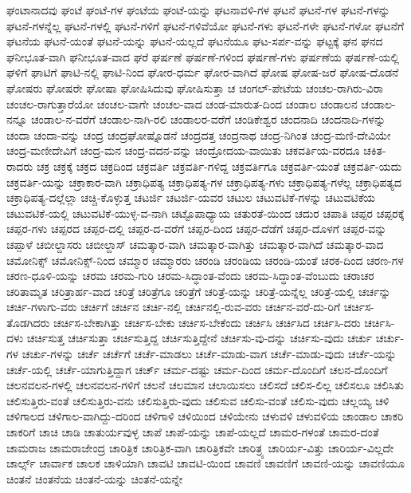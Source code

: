 {ಘಂಟಾನಾದವು
ಘಂಟೆ
ಘಂಟೆ-ಗಳ
ಘಂಟೆಯ
ಘಂಟೆ-ಯನ್ನು
ಘಟನಾವಳಿ-ಗಳ
ಘಟನೆ
ಘಟನೆ-ಗಳ
ಘಟನೆ-ಗಳನ್ನು
ಘಟನೆ-ಗಳನ್ನೆಲ್ಲ
ಘಟನೆ-ಗಳಲ್ಲಿ
ಘಟನೆ-ಗಳಿಗೆ
ಘಟನೆ-ಗಳಿವೆಯೋ
ಘಟನೆ-ಗಳು
ಘಟನೆ-ಗಳೇ
ಘಟನೆ-ಗಳೋ
ಘಟನೆಗೆ
ಘಟನೆಯ
ಘಟನೆ-ಯಂತೆ
ಘಟನೆ-ಯನ್ನು
ಘಟನೆ-ಯಲ್ಲದೆ
ಘಟನೆಯೂ
ಘಟ-ಸರ್ಪ-ವನ್ನು
ಘಟ್ಟಕ್ಕೆ
ಘನ
ಘನದ
ಘನೀಭೂತ-ವಾಗಿ
ಘನೀಭೂತ-ವಾದ
ಘರೆ
ಘರ್ಷಣೆ
ಘರ್ಷಣೆ-ಗಳಿಂದ
ಘರ್ಷಣೆ-ಗಳು
ಘರ್ಷಣೆಯ
ಘರ್ಷಣೆ-ಯಲ್ಲಿ
ಘಳಿಗೆ
ಘಾಟಿಗೆ
ಘಾಟಿ-ನಲ್ಲಿ
ಘಾಟಿ-ನಿಂದ
ಘೋರ-ಧರ್ಮ
ಘೋರ-ವಾಗಿದೆ
ಘೋಷ
ಘೋಷ-ಜರೆ
ಘೋಷ-ದೊಡನೆ
ಘೋಷರು
ಘೋಷರೇ
ಘೋಷಾ
ಘೋಷಿಸಿದುವು
ಘೋಷಿಸುತ್ತಾ
ಚ
ಚಂಗಲ್-ಪೇಟೆಯ
ಚಂಚಲ-ರಾಗಿರು-ವಿರಾ
ಚಂಚಲ-ರಾಗುತ್ತಾರೆಯೋ
ಚಂಚಲ-ವಾಗೇ
ಚಂಚಲ-ವಾದ
ಚಂಡ-ಮಾರುತ-ದಿಂದ
ಚಂಡಾಲ
ಚಂಡಾಲನ
ಚಂಡಾಲ-ನನ್ನೂ
ಚಂಡಾಲ-ನ-ವರೆಗೆ
ಚಂಡಾಲ-ನಾಗಿ-ರಲಿ
ಚಂಡಾಲರ-ವರೆಗೆ
ಚಂಡಿಕೇಶ್ವರ
ಚಂದನಾದಿ
ಚಂದನಾದಿ-ಗಳನ್ನು
ಚಂದಾ
ಚಂದಾ-ವನ್ನು
ಚಂದ್ರ
ಚಂದ್ರಘೋಷ್ನೊಡನೆ
ಚಂದ್ರದತ್ತ
ಚಂದ್ರನಾಥ
ಚಂದ್ರ-ನಿಗಿಂತ
ಚಂದ್ರ-ಮಣಿ-ದೇವಿಯೇ
ಚಂದ್ರ-ಮಣೀದೇವಿಗೆ
ಚಂದ್ರ-ಮನ
ಚಂದ್ರ-ವದನ-ವನ್ನು
ಚಂದ್ರೋದಯ-ವಾಯಿತು
ಚಕವರ್ತಿಯ-ವರದೂ
ಚಕಿತ-ರಾದರು
ಚಕ್ರ
ಚಕ್ರಕ್ಕೆ
ಚಕ್ರದ
ಚಕ್ರದಿಂದ
ಚಕ್ರವರ್ತಿ
ಚಕ್ರವರ್ತಿ-ಗಳಿದ್ದ
ಚಕ್ರವರ್ತಿಗೂ
ಚಕ್ರವರ್ತಿ-ಯಂತೆ
ಚಕ್ರವರ್ತಿ-ಯದು
ಚಕ್ರವರ್ತಿ-ಯನ್ನು
ಚಕ್ರಾಕಾರ-ವಾಗಿ
ಚಕ್ರಾಧಿಪತ್ಯ
ಚಕ್ರಾಧಿಪತ್ಯ-ಗಳ
ಚಕ್ರಾಧಿಪತ್ಯ-ಗಳು
ಚಕ್ರಾಧಿಪತ್ಯ-ಗಳೆಲ್ಲ
ಚಕ್ರಾಧಿಪತ್ಯದ
ಚಕ್ರಾಧಿಪತ್ಯ-ದಲ್ಲೆಲ್ಲಾ
ಚಚ್ಚಿ-ಕೊಳ್ಳುತ್ತ
ಚಟರ್ಜಿ
ಚಟರ್ಜಿ-ಯವರ
ಚಟುಲ
ಚಟುವಟಿಕೆ-ಗಳನ್ನು
ಚಟುವಟಿಕೆಯ
ಚಟುವಟಿಕೆ-ಯಲ್ಲಿ
ಚಟುವಟಿಕೆ-ಯುಳ್ಳ-ವ-ನಾಗಿ
ಚಟ್ಟೊಪಾಧ್ಯಾಯ
ಚತುರತೆ-ಯಿಂದ
ಚದುರ
ಚಪಾತಿ
ಚಪ್ಪರ
ಚಪ್ಪರಕ್ಕೆ
ಚಪ್ಪರ-ಗಳು
ಚಪ್ಪರದ
ಚಪ್ಪರ-ದಲ್ಲಿ
ಚಪ್ಪರ-ದ-ವರೆಗೆ
ಚಪ್ಪರ-ದಿಂದ
ಚಪ್ಪರ-ದೆಡೆಗೆ
ಚಪ್ಪರ-ದೊಳಗೆ
ಚಪ್ಪರ-ವನ್ನು
ಚಪ್ಪಾಳೆ
ಚಬೀಲ್ದಾಸರು
ಚಬೀಲ್ದಾಸ್
ಚಮತ್ಕಾರ-ವಾಗಿ
ಚಮತ್ಕಾರ-ವಾಗಿತ್ತು
ಚಮತ್ಕಾರ-ವಾಗಿದೆ
ಚಮತ್ಕಾರ-ವಾದ
ಚಮೋನಿಕ್ಸ್
ಚಮೋನಿಕ್ಸ್-ನಿಂದ
ಚಮ್ಮಾರ
ಚಮ್ಮಾರರು
ಚರಂಡಿ
ಚರಂಡಿಯ
ಚರಂಡಿ-ಯಂತೆ
ಚರಕ-ದಿಂದ
ಚರಣ-ಗಳ
ಚರಣ-ಧೂಳಿ-ಯನ್ನು
ಚರಮ
ಚರಮ-ಗುರಿ
ಚರಮ-ಸಿದ್ಧಾಂತ-ವೆಂದು
ಚರಮ-ಸಿದ್ಧಾಂತ-ವೆಂಬುದು
ಚರಾಚರ
ಚರಿತಾಮೃತ
ಚರಿತ್ರಾರ್ಹ-ವಾದ
ಚರಿತ್ರೆ
ಚರಿತ್ರೆಗೂ
ಚರಿತ್ರೆಗೆ
ಚರಿತ್ರೆ-ಯನ್ನು
ಚರಿತ್ರೆ-ಯನ್ನೆಲ್ಲ
ಚರಿತ್ರೆ-ಯಲ್ಲಿ
ಚರ್ಚನ್ನು
ಚರ್ಚಿ-ಗಳಾಗು-ವರು
ಚರ್ಚಿಗೆ
ಚರ್ಚಿನ
ಚರ್ಚಿ-ನಲ್ಲಿ
ಚರ್ಚಿನಲ್ಲಿ-ರುವ-ವರು
ಚರ್ಚಿನ-ವರೆ-ದು-ರಿಗೆ
ಚರ್ಚಿಸ-ತೊಡಗಿದರು
ಚರ್ಚಿಸ-ಬೇಕಾಗಿತ್ತು
ಚರ್ಚಿಸ-ಬೇಕು
ಚರ್ಚಿಸ-ಬೇಕೆಂದು
ಚರ್ಚಿಸಿ
ಚರ್ಚಿಸಿದ
ಚರ್ಚಿಸಿ-ದರು
ಚರ್ಚಿಸಿ-ದಳು
ಚರ್ಚಿಸುತ್ತ
ಚರ್ಚಿಸುತ್ತಾ
ಚರ್ಚಿಸುತ್ತಿದ್ದ
ಚರ್ಚಿಸುತ್ತಿದ್ದೇನೆ
ಚರ್ಚಿಸು-ವು-ದನ್ನು
ಚರ್ಚಿಸು-ವುದು
ಚರ್ಚು
ಚರ್ಚು-ಗಳ
ಚರ್ಚು-ಗಳನ್ನು
ಚರ್ಚೆ
ಚರ್ಚೆಗೆ
ಚರ್ಚೆ-ಮಾಡಲು
ಚರ್ಚೆ-ಮಾಡು-ವಾಗ
ಚರ್ಚೆ-ಮಾಡು-ವುದು
ಚರ್ಚೆ-ಯನ್ನು
ಚರ್ಚೆ-ಯಲ್ಲಿ
ಚರ್ಚೆ-ಯಾಗುತ್ತಿದ್ದಾಗ
ಚರ್ಚ್
ಚರ್ಮ-ದಷ್ಟು
ಚರ್ಮ-ದಿಂದ
ಚರ್ಮ-ದೊಂದಿಗೆ
ಚಲನ-ದೊಂದಿಗೆ
ಚಲನವಲನ-ಗಳಲ್ಲಿ
ಚಲನವಲನ-ಗಳಿಗೆ
ಚಲನೆ
ಚಲಮಾನ
ಚಲಾಯಿಸಲು
ಚಲಿಸದೆ
ಚಲಿಸ-ಲಿಲ್ಲ
ಚಲಿಸಲೂ
ಚಲಿಸಿತು
ಚಲಿಸುತ್ತಿರು-ವಂತೆ
ಚಲಿಸುತ್ತಿರು-ವನು
ಚಲಿಸುತ್ತಿರು-ವುದು
ಚಲಿಸುವ
ಚಲಿಸು-ವಂತೆ
ಚಲಿಸು-ವುದು
ಚಲ್ಲಯ್ಯ
ಚಳಿ
ಚಳಿಗಾಲದ
ಚಳಿಗಾಲ-ವಾಗಿದ್ದು-ದರಿಂದ
ಚಳಿಗಾಳಿ
ಚಳಿಯಿಂದ
ಚಳಿಯೇನು
ಚಳುವಳಿ
ಚಳುವಳಿಯ
ಚಾಂಡಾಲ
ಚಾಕರಿ
ಚಾಕರಿಗೆ
ಚಾಚಿ
ಚಾಡಿ
ಚಾತುರ್ಯವುಳ್ಳ
ಚಾಪೆ
ಚಾಪೆ-ಯನ್ನು
ಚಾಪೆ-ಯಲ್ಲದೆ
ಚಾಮರ-ಗಳಂತೆ
ಚಾಮರ-ದಂತೆ
ಚಾಮರಾಜ
ಚಾಮರಾಜೇಂದ್ರ
ಚಾರಿತ್ರಿಕ
ಚಾರಿತ್ರಿಕ-ವಾಗಿ
ಚಾರಿತ್ರಿಕವೇ
ಚಾರಿತ್ರ್ಯ
ಚಾರಿರ್ಯ-ವಿತ್ತು
ಚಾರಿರ್ಯ-ವಿಲ್ಲದೇ
ಚಾರ್ಲ್ಸ್
ಚಾರ್ವಾಕ
ಚಾಲಕ
ಚಾಳಿಯಾಗಿ
ಚಾವಟಿ
ಚಾವಟಿ-ಯಿಂದ
ಚಾವಣಿ
ಚಾವಣಿಗೆ
ಚಾವಣಿ-ಯನ್ನು
ಚಾವಣಿಯೂ
ಚಿಂತನೆ
ಚಿಂತನೆಯ
ಚಿಂತನೆ-ಯನ್ನು
ಚಿಂತನೆ-ಯನ್ನೇ
}
